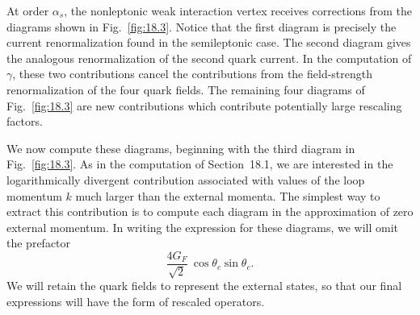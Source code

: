 At order $\alpha_s$, the nonleptonic weak interaction vertex receives
corrections from the diagrams shown in Fig.~\ref{fig:18.3}.  Notice that the
first diagram is precisely the current renormalization found in the
semileptonic case.  The second diagram gives the analogous renormalization
of the second quark current.  In the computation of $\gamma$, these two
contributions cancel the contributions from the field-strength
renormalization of the four quark fields.  The remaining four diagrams of
Fig.~\ref{fig:18.3} are new contributions which contribute potentially large
rescaling factors.

We now compute these diagrams, beginning with the third diagram in
Fig.~\ref{fig:18.3}.  As in the computation of Section~18.1, we are interested
in the logarithmically divergent contribution associated with values of the
loop momentum $k$ much larger than the external momenta.  The simplest way
to extract this contribution is to compute each diagram in the approximation
of zero external momentum.  In writing the expression for these diagrams, we
will omit the prefactor
\begin{equation}
  \frac{4G_F}{\sqrt{2}}\ \cos\theta_c\sin\theta_c .
  \label{eq:18.34}
\end{equation}
We will retain the quark fields to represent the external states, so that our
final expressions will have the form of rescaled operators.


